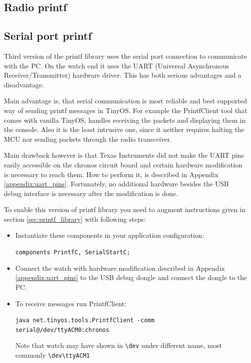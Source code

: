 \subsection{Radio printf}

\subsection{Serial port printf}
Third version of the printf library uses the serial port connection to
communicate with the PC. On the watch end it uses the UART (Universal
Asynchronous Receiver/Transmitter) hardware driver. This has both
serious advantages and a disadvantage.

Main advantage is, that serial communication is most reliable and best
supported way of sending printf messages in TinyOS. For example the
PrintfClient tool that comes with vanilla TinyOS, handles receiving
the packets and displaying them in the console. Also it is the least
intrusive one, since it neither requires halting the MCU nor sending
packets through the radio transceiver.

Main drawback however is that Texas Instruments did not make the UART
pins easily accessible on the chronos circuit board and certain
hardware modification is necessary to reach them. How to perform it,
is described in Appendix \ref{appendix:uart_pins}. Fortunately, no
additional hardware besides the USB debug interface is necessary after
the modification is done.

To enable this version of printf library you need to augment
instructions given in section \ref{sec:printf_library} with following
steps:

\begin{itemize}
  \item Instantiate these components in your application configuration:

  \texttt{components PrintfC, SerialStartC;}

  \item Connect the watch with hardware modification described in
    Appendix \ref{appendix:uart_pins} to the USB debug dongle and
    connect the dongle to the PC.

  \item To receive messages run PrintfClient:

  \texttt{java net.tinyos.tools.PrintfClient -comm serial@/dev/ttyACM0:chronos}

  Note that watch may have shown in \texttt{\textbackslash dev} under
  different name, most commonly
  \texttt{\textbackslash dev\textbackslash ttyACM1}
\end{itemize}

